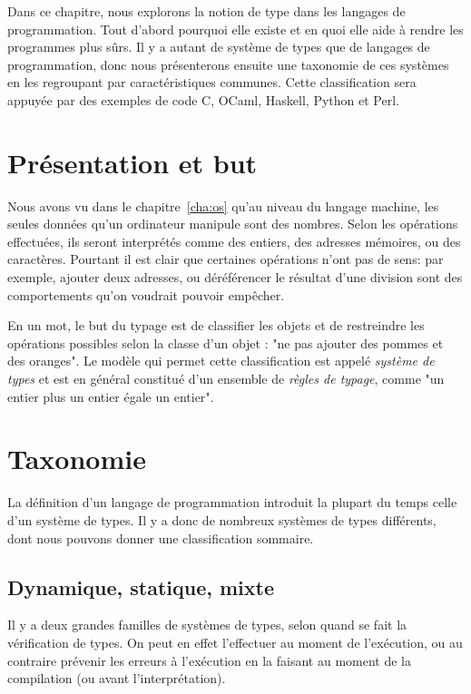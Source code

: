 Dans ce chapitre, nous explorons la notion de type dans les langages de
programmation. Tout d'abord pourquoi elle existe et en quoi elle aide à rendre
les programmes plus sûrs. Il y a autant de système de types que de langages de
programmation, donc nous présenterons ensuite une taxonomie de ces systèmes en
les regroupant par caractéristiques communes. Cette classification sera appuyée
par des exemples de code C\cite{AnsiC,KandR}, OCaml\cite{ocamlManual,DAOC},
Haskell\cite{haskell98,rwh}, Python\cite{pythonSite} et
Perl\cite{perlCamelBook}.

\section{Présentation et but}

Nous avons vu dans le chapitre~\ref{cha:os} qu'au niveau du langage machine, les
seules données qu'un ordinateur manipule sont des nombres. Selon les opérations
effectuées, ils seront interprétés comme des entiers, des adresses mémoires, ou
des caractères. Pourtant il est clair que certaines opérations n'ont pas de
sens: par exemple, ajouter deux adresses, ou déréférencer le résultat d'une
division sont des comportements qu'on voudrait pouvoir empêcher.

En un mot, le but du typage est de classifier les objets et de restreindre les
opérations possibles selon la classe d'un objet : "ne pas ajouter des pommes et
des oranges". Le modèle qui permet cette classification est appelé \emph{système
de types} et est en général constitué d'un ensemble de \emph{règles de typage},
comme "un entier plus un entier égale un entier".

\section{Taxonomie}

La définition d'un langage de programmation introduit la plupart du temps celle
d'un système de types. Il y a donc de nombreux systèmes de types différents,
dont nous pouvons donner une classification sommaire.

\subsection{Dynamique, statique, mixte}

Il y a deux grandes familles de systèmes de types, selon quand se fait la
vérification de types. On peut en effet l'effectuer au moment de l'exécution, ou
au contraire prévenir les erreurs à l'exécution en la faisant au moment de la
compilation (ou avant l'interprétation).

